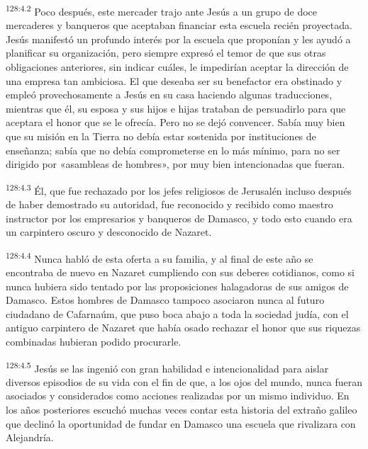 \par
\textsuperscript{128:4.2} Poco después, este mercader trajo ante Jesús a un grupo de doce mercaderes y banqueros que aceptaban financiar esta escuela recién proyectada. Jesús manifestó un profundo interés por la escuela que proponían y les ayudó a planificar su organización, pero siempre expresó el temor de que sus otras obligaciones anteriores, sin indicar cuáles, le impedirían aceptar la dirección de una empresa tan ambiciosa. El que deseaba ser su benefactor era obstinado y empleó provechosamente a Jesús en su casa haciendo algunas traducciones, mientras que él, su esposa y sus hijos e hijas trataban de persuadirlo para que aceptara el honor que se le ofrecía. Pero no se dejó convencer. Sabía muy bien que su misión en la Tierra no debía estar sostenida por instituciones de enseñanza; sabía que no debía comprometerse en lo más mínimo, para no ser dirigido por «asambleas de hombres», por muy bien intencionadas que fueran.

\par
\textsuperscript{128:4.3} Él, que fue rechazado por los jefes religiosos de Jerusalén incluso después de haber demostrado su autoridad, fue reconocido y recibido como maestro instructor por los empresarios y banqueros de Damasco, y todo esto cuando era un carpintero oscuro y desconocido de Nazaret.

\par
\textsuperscript{128:4.4} Nunca habló de esta oferta a su familia, y al final de este año se encontraba de nuevo en Nazaret cumpliendo con sus deberes cotidianos, como si nunca hubiera sido tentado por las proposiciones halagadoras de sus amigos de Damasco. Estos hombres de Damasco tampoco asociaron nunca al futuro ciudadano de Cafarnaúm, que puso boca abajo a toda la sociedad judía, con el antiguo carpintero de Nazaret que había osado rechazar el honor que sus riquezas combinadas hubieran podido procurarle.

\par
\textsuperscript{128:4.5} Jesús se las ingenió con gran habilidad e intencionalidad para aislar diversos episodios de su vida con el fin de que, a los ojos del mundo, nunca fueran asociados y considerados como acciones realizadas por un mismo individuo. En los años posteriores escuchó muchas veces contar esta historia del extraño galileo que declinó la oportunidad de fundar en Damasco una escuela que rivalizara con Alejandría.

